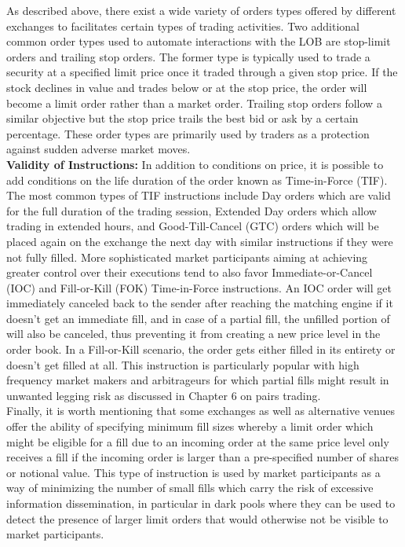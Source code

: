 As described above, there exist a wide variety of orders types offered by different exchanges to facilitates certain types of trading activities. Two additional common order types used to automate interactions with the LOB are stop-limit orders and trailing stop orders. The former type is typically used to trade a security at a specified limit price once it traded through a given stop price. If the stock declines in value and trades below or at the stop price, the order will become a limit order rather than a market order. Trailing stop orders follow a similar objective but the stop price trails the best bid or ask by a certain percentage. These order types are primarily used by traders as a protection against sudden adverse market moves.\\

\textbf{Validity of Instructions:}
In addition to conditions on price, it is possible to add conditions on the life duration of the order known as Time-in-Force (TIF). The most common types of TIF instructions include Day orders which are valid for the full duration of the trading session, Extended Day orders which allow trading in extended hours, and Good-Till-Cancel (GTC) orders which will be placed again on the exchange the next day with similar instructions if they were not fully filled. More sophisticated market participants aiming at achieving greater control over their executions tend to also favor Immediate-or-Cancel (IOC) and Fill-or-Kill (FOK) Time-in-Force instructions. An IOC order will get immediately canceled back to the sender after reaching the matching engine if it doesn't get an immediate fill, and in case of a partial fill, the unfilled portion of will also be canceled, thus preventing it from creating a new price level in the order book. In a Fill-or-Kill scenario, the order gets either filled in its entirety or doesn't get filled at all. This instruction is particularly popular with high frequency market makers and arbitrageurs for which partial fills might result in unwanted legging risk as discussed in Chapter 6  on pairs trading.\\


Finally, it is worth mentioning that some exchanges as well as alternative venues offer the ability of specifying minimum fill sizes whereby a limit order which might be eligible for a fill due to an incoming order at the same price level only receives a fill if the incoming order is larger than a pre-specified number of shares or notional value. This type of instruction is used by market participants as a way of minimizing the number of small fills which carry the risk of excessive information dissemination, in particular in dark pools where they can be used to detect the presence of larger limit orders that would otherwise not be visible to market participants.  \\




